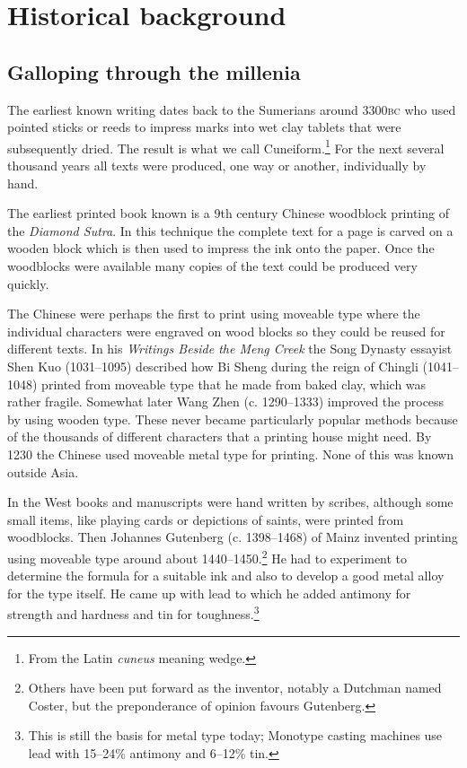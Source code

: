 \documentclass[10pt,a4paper,oneside,extrafontsizes]{memoir}%
\begin{document}
\chapter{Historical background} \label{chap:history}

\section{Galloping through the millenia}

\begin{paracol}{2}
\switchEng
    The earliest known writing dates back to the Sumerians around 3300\textsc{bc}
who used pointed sticks or reeds to impress marks into wet clay tablets
that were subsequently dried. The result is what we call 
Cuneiform.\footnote{From the Latin \emph{cuneus} meaning wedge.}
For the next several thousand years all texts were produced, one way or 
another, individually by hand.

    The earliest printed book known is a 9th century Chinese woodblock
printing of the \emph{Diamond Sutra}. In this technique the complete text
for a page is carved on a wooden block which is then used to impress
the ink onto the paper. Once the woodblocks were available many copies 
of the text could be produced very quickly.

    The Chinese were perhaps the first to print using moveable 
type where 
the individual characters were engraved on wood blocks so they could be 
reused for different texts. In his \emph{Writings Beside the Meng Creek}
the Song Dynasty essayist Shen Kuo (1031--1095) 
described how Bi Sheng during the reign of 
Chingli (1041--1048) printed
from moveable type that he made from baked clay, which was rather fragile.
Somewhat later Wang Zhen (c. 1290--1333) improved the 
process by using
wooden type. These never became particularly popular methods because 
of the thousands of different characters that a printing house might need.
By 1230 the Chinese used moveable metal type for printing. None of this was 
known outside Asia.

    In the West books and manuscripts were hand written by scribes, 
although some
small items, like playing cards or depictions of saints, were printed
from woodblocks. Then Johannes Gutenberg 
(c. 1398--1468) of Mainz invented printing using moveable type 
around about 1440--1450.\footnote{Others have been put forward as the 
inventor, notably a Dutchman named Coster, but the preponderance of 
opinion favours Gutenberg.}
 He had to experiment to determine the formula for
a suitable ink and also to develop a good metal alloy 
for the type itself.
He came up with lead to which he added antimony for strength and hardness and
tin for toughness.\footnote{This is still the basis for metal type today;
Monotype casting machines use lead with 15--24\% antimony and 6--12\% tin.}


\end{paracol}
\end{document}
